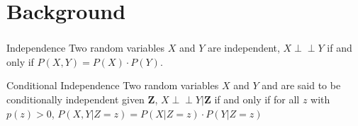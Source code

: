\documentclass{beamer}
\def\ci{\perp\!\!\!\!\!\perp}
\begin{document}
\section{Background}
\begin{frame}
	\frametitle{}
\end{frame}

\begin{frame}
	\frametitle{}
\end{frame}

\begin{frame}
	\frametitle{}
\end{frame}

\begin{frame}
	\frametitle{}
\end{frame}

\begin{frame}
	\frametitle{}
\end{frame}

\begin{frame}
	\frametitle{}
\end{frame}

\begin{frame}
	\frametitle{}
\end{frame}

\begin{frame}
	\frametitle{}
\end{frame}

\begin{frame}
	\frametitle{}
	\begin{block}{Independence}
		Two random variables $ X $ and $ Y $ are independent,
		$ X \ci Y $ if and only if $ P(X, Y) = P(X) \cdot P(Y) $.
	\end{block}
	\vspace{1em}

	\begin{block}{Conditional Independence}
		Two random variables $ X $ and $ Y $ and are said to be
		conditionally independent given $ \bm{Z} $, $ X \ci Y | \bm{Z}
		$ if and only if for all $ z $ with $ p(z) > 0 $, $ P(X, Y |
		Z=z) = P(X | Z=z) \cdot P(Y | Z=z) $
	\end{block}
\end{frame}
\end{document}
